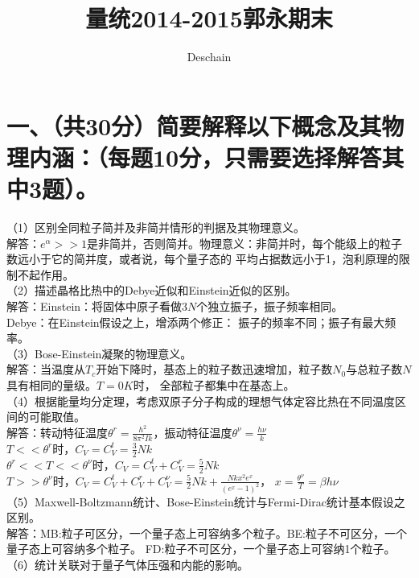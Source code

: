 \documentclass[UTF8]{ctexart}
\title{量统2014-2015郭永期末}
\author{Deschain}
\begin{document}
\maketitle
\section*{一、（共30分）简要解释以下概念及其物理内涵：（每题10分，只需要选择解答其中3题）。}
（1）区别全同粒子简并及非简并情形的判据及其物理意义。\\
解答：$e^\alpha>>1$是非简并，否则简并。物理意义：非简并时，每个能级上的粒子数远小于它的简并度，或者说，每个量子态的
平均占据数远小于1，泡利原理的限制不起作用。\\
（2）描述晶格比热中的Debye近似和Einstein近似的区别。\\
解答：Einstein：将固体中原子看做$3N$个独立振子，振子频率相同。\\Debye：在Einstein假设之上，增添两个修正：
振子的频率不同；振子有最大频率。\\
（3）Bose-Einstein凝聚的物理意义。\\
解答：当温度从$T_c$开始下降时，基态上的粒子数迅速增加，粒子数$N_0$与总粒子数$N$具有相同的量级。$T=0K$时，
全部粒子都集中在基态上。\\
（4）根据能量均分定理，考虑双原子分子构成的理想气体定容比热在不同温度区间的可能取值。\\
解答：转动特征温度$\theta^r=\frac{h^2}{8\pi^2Ik}$，振动特征温度$\theta^\nu=\frac{h\nu}{k}$\\
$T<<\theta^r$时，$C_V=C_V^t=\frac{3}{2}Nk$\\
$\theta^r<<T<<\theta^\nu$时，$C_V=C_V^t+C_V^r=\frac{5}{2}Nk$\\
$T>>\theta^\nu$时，$C_V=C_V^t+C_V^r+C_V^\nu=\frac{5}{2}Nk+\frac{Nkx^2e^x}{(e^x-1)^2}$，
$x=\frac{\theta^\nu}{T}=\beta h\nu$\\
（5）Maxwell-Boltzmann统计、Bose-Einstein统计与Fermi-Dirac统计基本假设之区别。\\
解答：MB:粒子可区分，一个量子态上可容纳多个粒子。BE:粒子不可区分，一个量子态上可容纳多个粒子。
FD:粒子不可区分，一个量子态上可容纳1个粒子。\\
（6）统计关联对于量子气体压强和内能的影响。\\
\end{document}
